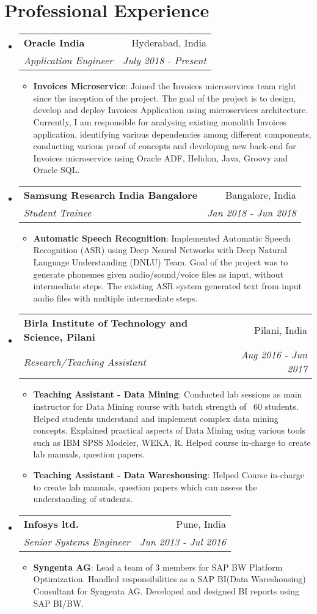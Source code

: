 \documentclass[letterpaper,11pt]{article}
\makeatletter
\newcommand{\resumeItem}[2]{
  \item\small{
    \textbf{#1}{: #2 \vspace{-2pt}}
  }
}
\newcommand{\resumeSubheading}[4]{
  \vspace{-1pt}\item
    \begin{tabular*}{0.97\textwidth}[t]{l@{\extracolsep{\fill}}r}
      \textbf{#1} & #2 \\
      \textit{\small#3} & \textit{\small #4} \\
    \end{tabular*}\vspace{-5pt}
}
\newcommand{\resumeSubHeadingListStart}{\begin{itemize}[leftmargin=*]}
\newcommand{\resumeSubHeadingListEnd}{\end{itemize}}
\newcommand{\resumeItemListStart}{\begin{itemize}}
\newcommand{\resumeItemListEnd}{\end{itemize}\vspace{-5pt}}
\makeatother
\begin{document}
\section{Professional Experience}
  \resumeSubHeadingListStart
    \resumeSubheading
      {Oracle India}{Hyderabad, India}
      {Application Engineer}{July 2018 - Present}
      \resumeItemListStart
        \resumeItem{Invoices Microservice}
      { Joined the Invoices microservices team right      since the inception of the project. The goal of   the project is to design,         develop and     deploy Invoices Application using microservices   architecture.
        Currently, I am responsible for analysing existing monolith Invoices application, identifying various dependencies among different components, conducting various proof of concepts and developing new back-end for Invoices microservice using Oracle ADF, Helidon, Java, Groovy and Oracle SQL.}
      \resumeItemListEnd
    \resumeSubheading
      {Samsung Research India Bangalore}{Bangalore, India}
      {Student Trainee}{Jan 2018 - Jun 2018}
      \resumeItemListStart
        \resumeItem{Automatic Speech Recognition}
          {Implemented Automatic Speech Recognition (ASR) using Deep Neural Networks with Deep Natural     Language Understanding (DNLU) Team. Goal of the project was to generate phonemes given audio/sound/voice files as input, without intermediate steps. The existing   ASR system generated text from input audio files with multiple intermediate steps.}
      \resumeItemListEnd
    \resumeSubheading
      {Birla Institute of Technology and Science, Pilani}{Pilani, India}
      {Research/Teaching Assistant}{Aug 2016 - Jun 2017}
      \resumeItemListStart
        \resumeItem{Teaching Assistant - Data Mining}
          {Conducted lab sessions as main instructor for Data Mining course with batch      strength of ~60 students. Helped students understand and implement complex      data mining concepts. Explained practical aspects of Data Mining using various tools such as IBM SPSS     Modeler, WEKA, R.
            Helped course in-charge to create lab manuals, question papers.}
        \resumeItem{Teaching Assistant - Data Wareshousing}
          {Helped Course in-charge to  create lab manuals, question papers which can assess the understanding of students.}
      \resumeItemListEnd
    \resumeSubheading
      {Infosys ltd.}{Pune, India}
      {Senior Systems Engineer}{Jun 2013 - Jul 2016}
      \resumeItemListStart
        \resumeItem{Syngenta AG}
          {Lead a team of 3 members for SAP BW Platform Optimization.
          Handled responsibilities as a SAP BI(Data Wareshousing) Consultant for Syngenta AG.
            Developed and designed BI reports using SAP BI/BW.
            }
      \resumeItemListEnd
  \resumeSubHeadingListEnd
\end{document}
